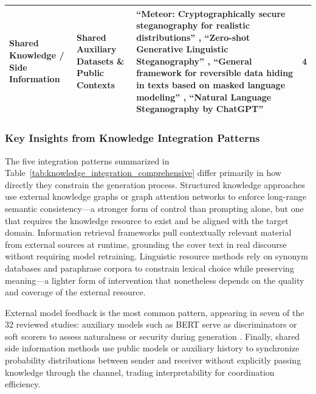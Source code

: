 \begin{table}[t]
\begin{tabular}{|>{\raggedright\arraybackslash}p{2cm}|>{\raggedright\arraybackslash}p{2cm}|>{\raggedright\arraybackslash}p{7cm}|c|}
    \hline
    Shared Knowledge / Side Information                 & Shared Auxiliary Datasets \& Public Contexts                                      & ``Meteor: Cryptographically secure steganography for realistic distributions'' \cite{kaptchuk2021meteor}, ``Zero-shot Generative Linguistic Steganography'' \cite{lin2024zero}, ``General framework for reversible data hiding in texts based on masked language modeling'' \cite{zheng2022general}, ``Natural Language Steganography by ChatGPT'' \cite{steinebach2024natural}                                                                                                                                                                                                                                                                                                                                                                                                           & 4              \\
    \hline
  \end{tabular}
\end{table}

\subsubsection{Key Insights from Knowledge Integration Patterns}

The five integration patterns summarized in Table~\ref{tab:knowledge_integration_comprehensive} differ primarily in how directly they constrain the generation process. Structured knowledge approaches \cite{li2024semantic,ding2023joint} use external knowledge graphs or graph attention networks to enforce long-range semantic consistency---a stronger form of control than prompting alone, but one that requires the knowledge resource to exist and be aligned with the target domain. Information retrieval frameworks \cite{wang2023hi,liao2024co} pull contextually relevant material from external sources at runtime, grounding the cover text in real discourse without requiring model retraining. Linguistic resource methods \cite{qiang2023natural,ou2025multigranularity} rely on synonym databases and paraphrase corpora to constrain lexical choice while preserving meaning---a lighter form of intervention that nonetheless depends on the quality and coverage of the external resource.

External model feedback is the most common pattern, appearing in seven of the 32 reviewed studies: auxiliary models such as BERT serve as discriminators or soft scorers to assess naturalness or security during generation \cite{xiang2023cpg,munyer2024deeptextmark}. Finally, shared side information methods \cite{kaptchuk2021meteor,lin2024zero} use public models or auxiliary history to synchronize probability distributions between sender and receiver without explicitly passing knowledge through the channel, trading interpretability for coordination efficiency.
